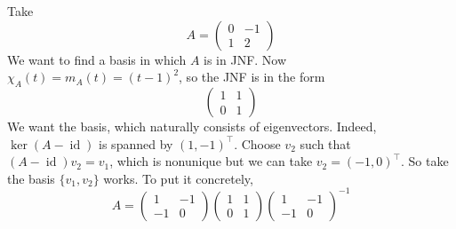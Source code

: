 \begin{example}
    Take
    $$A=\begin{pmatrix}
        0&-1\\
        1&2
    \end{pmatrix}$$
    We want to find a basis in which $A$ is in JNF.
    Now $\chi_A(t)=m_A(t)=(t-1)^2$, so the JNF is in the form
    $$\begin{pmatrix}
        1&1\\
        0&1
    \end{pmatrix}$$
    We want the basis, which naturally consists of eigenvectors.
    Indeed, $\ker(A-\operatorname{id})$ is spanned by $(1,-1)^\top$.
    Choose $v_2$ such that $(A-\operatorname{id})v_2=v_1$, which is nonunique but we can take $v_2=(-1,0)^\top$.
    So take the basis $\{v_1,v_2\}$ works.
    To put it concretely,
    $$A=\begin{pmatrix}
        1&-1\\
        -1&0
    \end{pmatrix}\begin{pmatrix}
        1&1\\
        0&1
    \end{pmatrix}\begin{pmatrix}
        1&-1\\
        -1&0
    \end{pmatrix}^{-1}$$
\end{example}